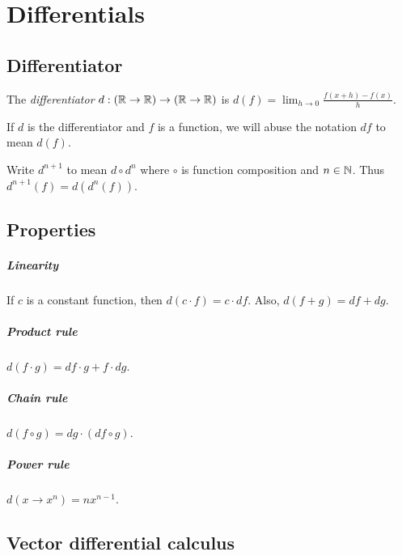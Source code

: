 \chapter{Differentials}

\section{Differentiator}

%
The \emph{differentiator}
\(d : (\mathbb{R} \to \mathbb{R}) \to (\mathbb{R} \to \mathbb{R})\)
is \(d(f) = \lim_{h\to 0} \frac{f(x+h)-f(x)}{h}\).

If \(d\) is the differentiator and \(f\) is a function,
we will abuse the notation \(df\) to mean \(d(f)\).

Write \(d^{n+1}\) to mean \(d \circ d^n\)
where \(\circ\) is function composition
and \(n \in \mathbb{N}\).
Thus \(d^{n+1}(f) = d(d^n(f))\).

\section{Properties}

%
\paragraph{Linearity}
If \(c\) is a constant function, then \(d(c \cdot f) = c \cdot df\).
Also, \(d(f+g) = df + dg\).

%
%
\paragraph{Product rule}
\(d(f \cdot g) = df \cdot g + f \cdot dg\).

%
%
\paragraph{Chain rule}
\(d(f \circ g) = dg \cdot (df \circ g)\).

%
%
\paragraph{Power rule}
\(d(x \to x^n) = n x^{n-1}\).

\section{Vector differential calculus}

